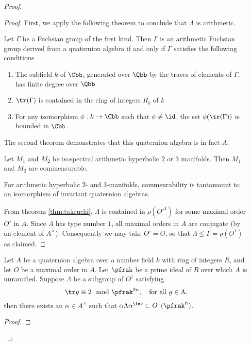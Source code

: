 \begin{proof}
\begin{proof}
First, we apply the following theorem to conclude that $\Lambda$ is arithmetic.
\begin{thm}\label{thm:takeuchi}
  Let $\Gamma$ be a Fuchsian group of the first kind. Then $\Gamma$ is an arithmetic Fuchsian group derived from a quaternion algebra if and only if $\Gamma$ satisfies the following conditions
  \begin{enumerate}
    \item The subfield $k$ of $\Cbb$, generated over $\Qbb$ by the traces of elements of $\Gamma$, has finite degree over $\Qbb$
    \item $\tr(\Gamma)$ is contained in the ring of integers $R_{k}$ of $k$
    \item For any isomorphism $\phi: k \to \Cbb$ such that $\phi \neq \id$, the set $\phi(\tr(\Gamma))$ is bounded in $\Cbb$.
  \end{enumerate}
\end{thm}

The second theorem demonstrates that this quaternion algebra is in fact $A$.
\begin{thm}

\begin{}
Let $M_1$ and $M_2$ be isospectral arithmetic hyperbolic $2$ or $3$ manifolds. Then $M_1$ and $M_2$ are commensurable.
\end{}
\end{thm}
For arithmetic hyperbolic $2$- and $3$-manifolds, commsurability is tantamount to an isomorphism of invariant quaternion algebras.

From theorem \ref{thm:takeuchi}, $\Lambda$ is contained in $\rho(O'^1)$ for some maximal order $O'$ in $A$. Since $A$ has type number $1$, all maximal orders in $A$ are conjugate (by an element of $A^\times$). Consequently we may take $O'=O$, so that $\Lambda \leq \Gamma = \rho(O^1)$ as claimed.


\end{proof}
\begin{lemma}\label{lemma:MangosteenPicosdeEuropa}
  Let $A$ be a quaternion algebra over a number field $k$ with ring of integers $R$, and let $O$ be a maximal order in $A$.
  Let $\pfrak$ be a prime ideal of $R$ over which $A$ is unramified.
  Suppose $\Lambda$ be a subgroup of $O^1$ satisfying
  \begin{align}\label{eq:trace}
    \tr g \equiv 2 \mod \pfrak^{2n}, \quad \text{for all $g \in \Lambda$}.
  \end{align}
  then there exists an $\alpha \in A^\times$ such that $\alpha \Lambda \alpha^\inv \subset O^1(\pfrak^n)$.
\end{lemma}
\begin{proof}



\end{proof}
\end{proof}
